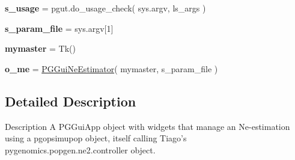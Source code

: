 \begin{DoxyCompactItemize}
\item 
{\bfseries s\+\_\+usage} = pgut.\+do\+\_\+usage\+\_\+check( sys.\+argv, ls\+\_\+args )\hypertarget{namespacenegui_1_1temp_a876992d8cfd2bffc07d022bcb7812b9c}{}\label{namespacenegui_1_1temp_a876992d8cfd2bffc07d022bcb7812b9c}

\item 
{\bfseries s\+\_\+param\+\_\+file} = sys.\+argv\mbox{[}1\mbox{]}\hypertarget{namespacenegui_1_1temp_ac04fe747814add4395387c6c16e92bcc}{}\label{namespacenegui_1_1temp_ac04fe747814add4395387c6c16e92bcc}

\item 
{\bfseries mymaster} = Tk()\hypertarget{namespacenegui_1_1temp_a9d64fd2e69ffd2f71685a613b5d0e323}{}\label{namespacenegui_1_1temp_a9d64fd2e69ffd2f71685a613b5d0e323}

\item 
{\bfseries o\+\_\+me} = \hyperlink{classnegui_1_1temp_1_1PGGuiNeEstimator}{P\+G\+Gui\+Ne\+Estimator}( mymaster, s\+\_\+param\+\_\+file )\hypertarget{namespacenegui_1_1temp_a8b8d51cf7e38250ea6c7e3b70a3ef580}{}\label{namespacenegui_1_1temp_a8b8d51cf7e38250ea6c7e3b70a3ef580}

\end{DoxyCompactItemize}


\subsection{Detailed Description}
\begin{DoxyVerb}Description
A PGGuiApp object with widgets that manage an Ne-estimation using
a pgopsimupop object, itself calling Tiago's pygenomics.popgen.ne2.controller
object.
\end{DoxyVerb}
 